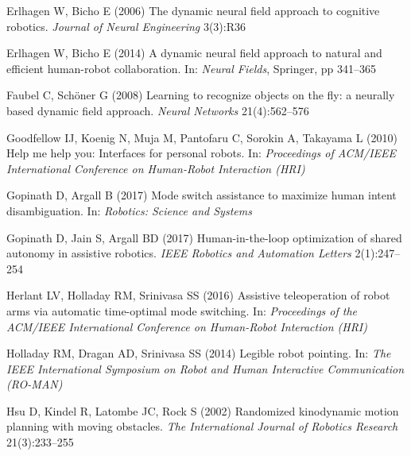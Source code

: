 \documentclass[natbib, twocolumn]{svjour3}          %
\begin{document}
\begin{thebibliography}{54}
	Erlhagen W, Bicho E (2006) The dynamic neural field approach to cognitive
	robotics. \textit{Journal of Neural Engineering} 3(3):R36
	
	Erlhagen W, Bicho E (2014) A dynamic neural field approach to natural and
	efficient human-robot collaboration. In: \textit{Neural Fields}, Springer, pp
	341--365
	
	Faubel C, Sch{\"o}ner G (2008) Learning to recognize objects on the fly: a
	neurally based dynamic field approach. \textit{Neural Networks}
	21(4):562--576
	
	Goodfellow IJ, Koenig N, Muja M, Pantofaru C, Sorokin A, Takayama L (2010) Help
	me help you: Interfaces for personal robots. In: \textit{Proceedings of
		ACM/IEEE International Conference on Human-Robot Interaction (HRI)}
	
	Gopinath D, Argall B (2017) Mode switch assistance to maximize human intent
	disambiguation. In: \textit{Robotics: Science and Systems}
	
	Gopinath D, Jain S, Argall BD (2017) Human-in-the-loop optimization of shared
	autonomy in assistive robotics. \textit{IEEE Robotics and Automation Letters}
	2(1):247--254
	
	Herlant LV, Holladay RM, Srinivasa SS (2016) Assistive teleoperation of robot
	arms via automatic time-optimal mode switching. In: \textit{Proceedings of
		the ACM/IEEE International Conference on Human-Robot Interaction (HRI)}
	
	Holladay RM, Dragan AD, Srinivasa SS (2014) Legible robot pointing. In:
	\textit{The IEEE International Symposium on Robot and Human Interactive
		Communication (RO-MAN)}
	
	Hsu D, Kindel R, Latombe JC, Rock S (2002) Randomized kinodynamic motion
	planning with moving obstacles. \textit{The International Journal of Robotics
		Research} 21(3):233--255
	

\end{thebibliography}
\end{document}
